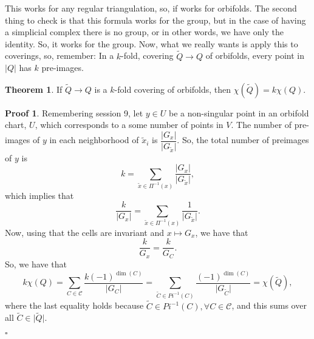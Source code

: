 \documentclass[12pt,a4paper,oneside]{article}
\numberwithin{equation}{section}
\theoremstyle{definition}
\newtheorem*{theorem}{Theorem}
\newtheorem*{prof}{Proof}
\def\qed{\hfill $\square$}
\begin{document}
This works for any regular triangulation, so, if works for orbifolds. \newline
The second thing to check is that this formula works for the group, but in the case of having a simplicial complex there is no group, or in other words, we have only the identity. So, it works for the group. \newline
Now, what we really wants is apply this to coverings, so, remember: \newline
In a $k$-fold, covering $\tilde{Q} \rightarrow Q$ of orbifolds, every point in $\vert Q \vert$ has $k$ pre-images. \newline
\begin{theorem} If $\tilde{Q} \rightarrow Q$ is a $k$-fold covering of orbifolds, then $\chi(\tilde{Q}) = k \chi (Q)$.
\end{theorem}
\begin{prof} Remembering session 9, let $y \in U$ be a non-singular point in an orbifold chart, $U$, which corresponds to a some number of points in $V$. \newline
The number of pre-images of $y$ in each neighborhood of $\tilde{x}_{i}$ is $\dfrac{\vert G_{x} \vert}{\vert G_{\tilde{x}} \vert}$. \newline
So, the total number of preimages of $y$ is $$k = \sum_{\tilde{x} \in \Pi ^{-1}(x)} \frac{\vert G_{x} \vert}{\vert G_{\tilde{x}} \vert},$$ which implies that $$\frac{k}{\vert G_{x} \vert} = \sum _{\tilde{x} \in \Pi ^{-1}(x)} \frac{1}{\vert G_{\tilde{x}} \vert}.$$ Now, using that the cells are invariant and $x \mapsto G_{x}$, we have that $$\frac{k}{G_{x}} = \frac{k}{G_{C}}.$$ So, we have that $$k \chi (Q) = \sum_{C \in \mathcal{C}} \frac{k (-1)^{\dim (C)}}{\vert G_{C} \vert} = \sum _{\tilde{C} \in Pi^{-1}(C)} \frac{(-1)^{\dim (C)}}{\vert G_{\tilde{C}} \vert} = \chi (\tilde{Q}),$$ where the last equality holds because $\tilde{C} \in Pi^{-1}(C), \forall C \in \mathcal{C}$, and this sums over all $\tilde{C} \in \vert \tilde{Q} \vert$.
\end{prof}
\qed
\end{document}
